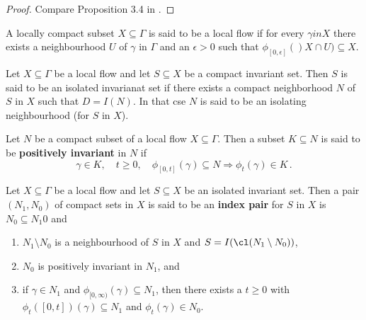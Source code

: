 \begin{proof}
	Compare Proposition 3.4 in \cite{Salamon1985}.
\end{proof}
\begin{definition}
	A locally compact subset $X\subseteq \Gamma$ is said to be a local flow if for every $\gamma in X$ there exists a neighbourhood $U$ of $\gamma$ in $\Gamma$ and an $\epsilon >0$ such that $\phi_{[0,\epsilon]}{()X\cap U)}\subseteq X$.
\end{definition}
\begin{definition}
	Let $X\subseteq \Gamma$ be a local flow and let $S\subseteq X$ be a compact invariant set. Then $S$ is said to be an isolated invarianat set if there exists a compact neighborhood $N$ of $S$ in $X$ such that $D=I(N)$. In that cse $N$ is said to be an isolating neighbourhood (for $S$ in $X$).
\end{definition} 
\begin{definition}
	Let $N$ be a compact subset of a local flow $X\subseteq \Gamma$. Then a subset $K\subseteq N$ is said to be \textbf{positively invariant} in $N$ if 
	\begin{equation*}
		\gamma \in K , \quad t\geq0,\quad \phi_{[0,t]}(\gamma)\subseteq N \Rightarrow \phi_t(\gamma)\in K\, .
	\end{equation*}
\end{definition}

\begin{definition}
	Let $X\subseteq \Gamma$ be a local flow and let $S\subseteq X$ be an isolated invariant set. Then a pair $(N_1,N_0)$ of compact sets in $X$ is said to be an \textbf{index pair} for $S$ in $X$ is $N_0\subseteq N_1$0 and
	\begin{enumerate}
		\item $N_1\setminus N_0$ is a neighbourhood of $S$ in $X$ and $S=I(\cl(N_1\setminus N_0))$,
		\item $N_0$ is positively invariant in $N_1$, and
		\item if $\gamma\in N_1$ and $\phi_{[0,\infty)}(\gamma)\subseteq N_1$, then there exists a $t\geq0$ with $\phi_t([0,t])(\gamma)\subseteq N_1$ and $\phi_t(\gamma)\in N_0$.
	\end{enumerate}
\end{definition}